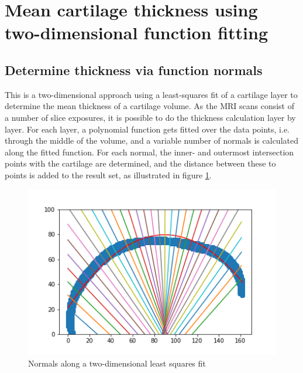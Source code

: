 \section{Mean cartilage thickness using two-dimensional function fitting}
\subsection{Determine thickness via function normals}
This is a two-dimensional approach using a least-squares fit of a cartilage layer to determine the mean thickness of a cartilage volume. As the MRI scans consist of a number of slice exposures, it is possible to do the thickness calculation layer by layer. For each layer, a polynomial function gets fitted over the data points, i.e. through the middle of the volume, and a variable number of normals is calculated along the fitted function. For each normal, the inner- and outermost intersection points with the cartilage are determined, and the distance between these to points is added to the result set, as illustrated in figure \ref{fig:normals}.
\begin{figure}[htb!]
	\centering
	\includegraphics[width=\linewidth]{./figures/normals}
	\caption{Normals along a two-dimensional least squares fit}
	\label{fig:normals}
\end{figure} 

